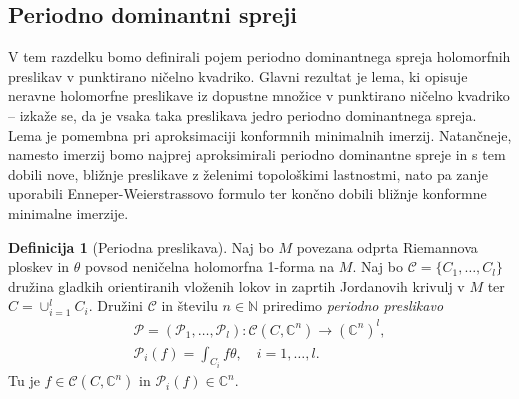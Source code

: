 \documentclass[12pt,a4paper,twoside]{article}
\theoremstyle{definition} %
\newtheorem{definicija}{Definicija}[section]
\theoremstyle{plain} %
\numberwithin{equation}{section}  %
\newcommand{\N}{\mathbb N}
\newcommand{\C}{\mathbb C}
\begin{document}
\subsection{Periodno dominantni spreji}
%
V tem razdelku bomo definirali pojem periodno dominantnega spreja holomorfnih preslikav v punktirano ničelno kvadriko. Glavni rezultat je lema, ki opisuje neravne holomorfne preslikave iz dopustne množice v punktirano ničelno kvadriko -- izkaže se, da je vsaka taka preslikava jedro periodno dominantnega spreja. Lema je pomembna pri aproksimaciji konformnih minimalnih imerzij. Natančneje, namesto imerzij bomo najprej aproksimirali periodno dominantne spreje in s tem dobili nove, bližnje preslikave z želenimi topološkimi lastnostmi, nato pa zanje uporabili Enneper-Weierstrassovo formulo ter končno dobili bližnje konformne minimalne imerzije.

\begin{definicija} [Periodna preslikava]
Naj bo $M$ povezana odprta Riemannova ploskev in $\theta$ povsod neničelna holomorfna 1-forma na $M$. Naj bo $\mathcal{C} = \{C_1, \dots , C_{l} \}$ družina gladkih orientiranih vloženih lokov in zaprtih Jordanovih krivulj v $M$ ter $C = \cup_{i=1}^{l} C_{i}$.
Družini $\mathcal{C}$ in številu $n \in \N$ priredimo \emph{periodno preslikavo}
\begin{gather}
\mathcal{P} = (\mathcal{P}_1, \dots , \mathcal{P}_{l}) \colon \mathcal{C}(C, \C^{n}) \to (\C^{n})^{l}, \nonumber \\
\mathcal{P}_{i}(f) = \int_{C_{i}} f \theta, \quad i=1, \dots , l.
\end{gather}
Tu je $f \in \mathcal{C}(C, \C^{n})$ in $\mathcal{P}_{i}(f) \in \C^{n}$.
\end{definicija}
\end{document}
